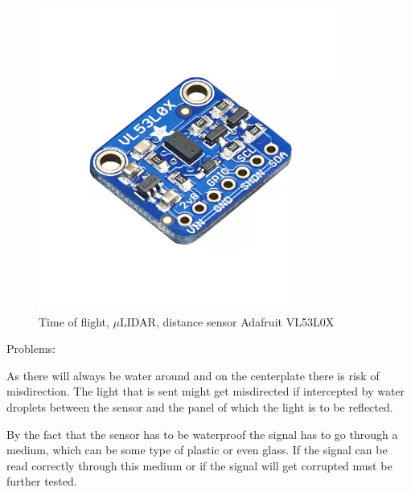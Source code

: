 \begin{figure}[H]
	\centering %
	\includegraphics[width = 10cm]{Figures/Adafruit_height_sensor.png}
	\caption{Time of flight, $\mu$LIDAR, distance sensor Adafruit VL53L0X}
	\label{micro_lidar}
\end{figure}
Problems: %

As there will always be water around and on the centerplate there is risk of misdirection. The light that is sent might get misdirected if intercepted by water droplets between the sensor and the panel of which the light is to be reflected. %

By the fact that the sensor has to be waterproof the signal has to go through a medium, which can be some type of plastic or even glass.  
If the signal can be read correctly through this medium or if the signal will get corrupted must be further tested. %
